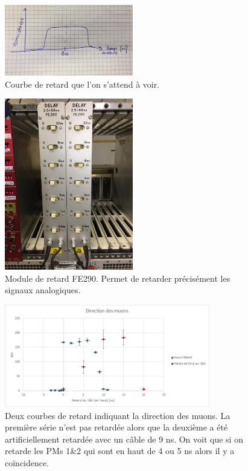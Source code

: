 \documentclass[12pt]{article}
\begin{document}
\begin{figure}[htpb!]
    \centering
    \includegraphics[width=0.5\textwidth]{Images/Schemas/CourbeDeRetard.jpg}
    \captionsetup{width=0.8\textwidth}
    \caption{Courbe de retard que l'on s'attend à voir.}
    \label{fig:Schema_Courbe_de_retard}
\end{figure}

\begin{figure}[htpb!]
    \centering
    \includegraphics[width=0.5\textwidth]{Images/Photos/Delay2.jpg}
    \captionsetup{width=0.8\textwidth}
    \caption{Module de retard FE290. Permet de retarder précisément les signaux analogiques.}
    \label{fig:Delay}
\end{figure}

\begin{figure}[htpb!]
    \centering
    \includegraphics[width=0.8\textwidth]{graphiques/experience2/DirectionMuons.png}
    \captionsetup{width=0.8\textwidth}
    \caption{Deux courbes de retard indiquant la direction des muons. La première série n'est pas retardée alors que la deuxième a été artificiellement retardée avec un câble de 9 ns. On voit que si on retarde les PMs 1\&2 qui sont en haut de 4 ou 5 ns alors il y a coïncidence.}
    \label{fig:CourbeRetard}
\end{figure}
\end{document}
